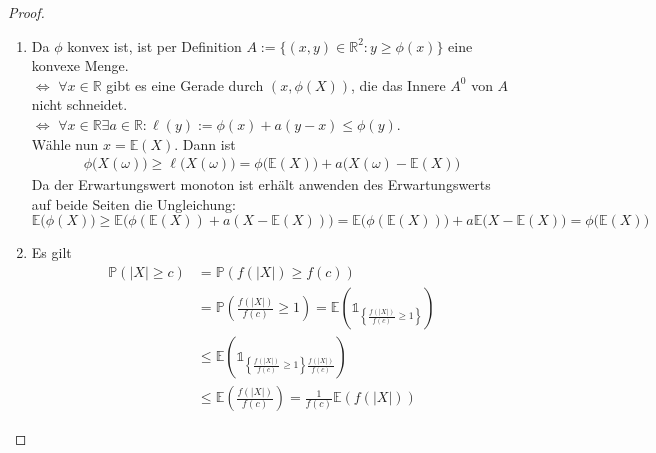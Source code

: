 \documentclass[10pt,a4paper]{article}
\newcommand{\R}{\ensuremath{\mathbb{R}}}
\newcommand{\cha}{\mathds{1}}
\newcommand{\Prb}{\mathbb P}
\newcommand{\Epv}{\ensuremath{\mathbb{E}}}
\theoremstyle{plain}
\theoremstyle{definition}
\theoremstyle{remark}
\begin{document}
	\begin{proof}
		\begin{enumerate}
			\item Da $\phi$ konvex ist, ist per Definition $A:=\{(x,y)\in\R^2:y\geq\phi(x)\}$ eine konvexe Menge.\\
			$\Leftrightarrow$ $\forall x\in\R$ gibt es eine Gerade durch $(x,\phi(X))$, die das Innere $A^0$ von $A$ nicht schneidet.\\
			$\Leftrightarrow $ $\forall x\in\R\exists a\in\R:\ell(y):=\phi(x)+a(y-x)\leq \phi(y)$.\\
			Wähle nun $x=\Epv(X)$. Dann ist 
			\begin{align*}
			\phi\big(X(\omega)\big)\geq \ell\big(X(\omega)\big)=\phi\big(\Epv(X)\big)+a\big(X(\omega)-\Epv(X)\big)
			\end{align*}
			Da der Erwartungswert monoton ist erhält anwenden des Erwartungswerts auf beide Seiten die Ungleichung:
			\[\Epv\big(\phi(X)\big)\geq \Epv\big(\phi(\Epv(X))+a(X-\Epv(X))\big)
			=\Epv\big(\phi(\Epv(X))\big)+a\Epv\big(X-\Epv(X)\big)=\phi\big(\Epv(X)\big)\]
			
			\setcounter{enumi}{3}
			\item Es gilt
			\begin{align*}
			\Prb(|X|\ge c)&=\Prb(f(|X|)\geq f(c))\\
			&=\Prb\left(\frac{f(|X|)}{f(c)}\geq 1\right)=\Epv\left(\cha_{\left\{\frac{f(|X|)}{f(c)}\geq 1\right\}}\right)\\
			&\leq\Epv\left(\cha_{\left\{\frac{f(|X|)}{f(c)}\geq 1\right\}\frac{f(|X|)}{f(c)}}\right)\\
			&\leq\Epv\left(\frac{f(|X|)}{f(c)}\right)=\frac{1}{f(c)}\Epv(f(|X|))
			\end{align*}
			

\end{enumerate}
\end{proof}
\end{document}
